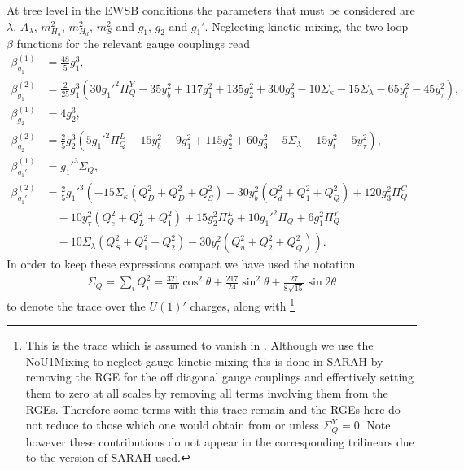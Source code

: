 \documentclass[preprint,amsmath,amssymb,aps,superscriptaddress,prd,showpacs,floatfix,nofootinbib]{revtex4-1}
\begin{document}
At tree level in the EWSB
conditions the parameters that must be considered are $\lambda$,
$A_\lambda$, $m_{H_u}^2$, $m_{H_d}^2$, $m_S^2$ and $g_1$, $g_2$ and
$g_1'$. Neglecting kinetic mixing, the two-loop $\beta$ functions for
the relevant gauge couplings read
\begin{subequations}\label{eq:USSMGaugeBetas}
\begin{align}
\beta_{g_1}^{(1)}&=\frac{48}{5}g_1^3,\label{eq:USSMg1BetaOneLoop}\\
\beta_{g_1}^{(2)}&=\frac{2}{25} g_1^3 \left(30 g_1'^2 \Pi_{Q}^Y-35 y_b^2+117 g_1^2+135 g_2^2+300 g_3^2-10 \Sigma _{\kappa }-15
   \Sigma _{\lambda }-65 y_t^2-45 y_{\tau }^2\right),\label{eq:USSMg1BetaTwoLoop}\\
\beta_{g_2}^{(1)}&=4g_2^3,\label{eq:USSMg2BetaOneLoop}\\
\beta_{g_2}^{(2)}&=\frac{2}{5} g_2^3 \left(5 g_1'^2 \Pi _{Q}^L-15 y_b^2+9 g_1^2+115 g_2^2+60 g_3^2-5 \Sigma _{\lambda }-15
   y_t^2-5 y_{\tau }^2\right),\label{eq:USSMg2BetaTwoLoop}\\
\beta_{g_1'}^{(1)}&=g_1'^3\Sigma_{Q},\label{eq:USSMg1pBetaOneLoop}\\
\beta_{g_1'}^{(2)}&=\frac{2}{5} g_1'^3 \left(-15 \Sigma _{\kappa } \left(Q_{\bar{D}}^2+Q_D^2+Q_S^2\right)-30
   y_b^2 \left(Q_d^2+Q_1^2+Q_Q^2\right)+120 g_3^2 \Pi _{Q}^C\right.\nonumber \\
&\quad{}-10 y_{\tau }^2
   \left(Q_e^2+Q_L^2+Q_1^2\right)+15 g_2^2 \Pi _{Q}^L+10 g_1'^2 \Pi _{Q}+6
   g_1^2 \Pi _{Q}^Y\nonumber\\
&\quad\left.{}-10 \Sigma _{\lambda } \left(Q_S^2+Q_1^2+Q_2^2\right)-30 y_t^2
   \left(Q_u^2+Q_2^2+Q_Q^2\right)\right).\label{eq:USSMg1pBetaTwoLoop}
\end{align}
\end{subequations}
In order to keep these expressions compact we have used the notation
\begin{align*}
\Sigma_{Q}=\sum_i Q_i^2=\frac{321}{40}\cos^2\theta+\frac{217}{24}\sin^2\theta+\frac{27}{8\sqrt{15}}\sin 2\theta
\end{align*}
to denote the trace over the $U(1)'$ charges, along
with \footnote{This is the trace which is assumed to vanish in
  \cite{Martin:1993zk}.  Although we use the NoU1Mixing to neglect
  gauge kinetic mixing this is done in SARAH by removing the RGE for
  the off diagonal gauge couplings and effectively setting them to
  zero at all scales by removing all terms involving them from the
  RGEs.  Therefore some terms with this trace remain and the RGEs here
  do not reduce to those which one would obtain from
  \cite{Martin:1993zk} or \cite{Athron:2009bs} unless $\Sigma_{Q}^Y =
  0$.  Note however these contributions do not appear in the
  corresponding trilinears due to the version of SARAH used. }
\end{document}
